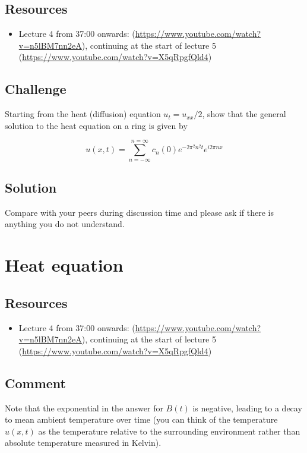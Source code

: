 \subsection*{Resources}
\begin{itemize}
    \item Lecture 4 from 37:00 onwards: (\url{https://www.youtube.com/watch?v=n5lBM7nn2eA}), continuing at the start of lecture 5 (\url{https://www.youtube.com/watch?v=X5qRpgfQld4})
\end{itemize}

\subsection*{Challenge}
Starting from the heat (diffusion) equation $u_t = u_{xx}/2$, show that the general solution to the heat equation on a ring is given by

\begin{equation}
    u(x,t) = \sum_{n=-\infty}^{n=\infty} c_n(0) e^{-2 \pi^2 n^2 t} e^{i 2 \pi n x}
\end{equation}


\subsection*{Solution}
Compare with your peers during discussion time and please ask if there is anything you do not understand.




\newpage
\section{Heat equation}
\label{sec:heateqn}

\subsection*{Resources}
\begin{itemize}
    \item Lecture 4 from 37:00 onwards: (\url{https://www.youtube.com/watch?v=n5lBM7nn2eA}), continuing at the start of lecture 5 (\url{https://www.youtube.com/watch?v=X5qRpgfQld4})
\end{itemize}

\subsection*{Comment}
Note that the exponential in the answer for $B(t)$ is negative, leading to a decay to mean ambient temperature over time (you can think of the temperature $u(x,t)$ as the temperature relative to the surrounding environment rather than absolute temperature measured in Kelvin).

